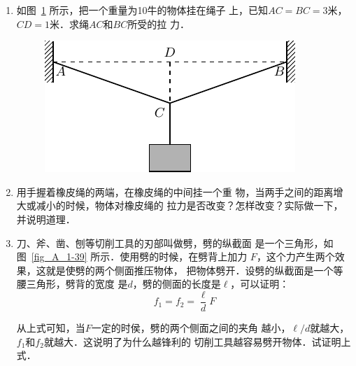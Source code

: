 \begin{enumerate}
\item 如图~\ref{fig_A_1-38} 所示，把一个重量为10牛的物体挂在绳子
上，已知$AC=BC=3$米，$CD=1$米．求绳$AC$和$BC$所受的拉
力．
\begin{figure} [htp]
\centering
\includegraphics{fig/A/1-38.pdf}
\caption{} \label{fig_A_1-38} 
\end{figure} 


\item   用手握着橡皮绳的两端，在橡皮绳的中间挂一个重
物，当两手之间的距离增大或减小的时候，物体对橡皮绳的
拉力是否改变？怎样改变？实际做一下，并说明道理．

\item  刀、斧、凿、刨等切削工具的刃部叫做劈，劈的纵截面
是一个三角形，如图~\ref{fig_A_1-39} 所示．使用劈的时候，在劈背上加力
$F$，这个力产生两个效果，这就是使劈的两个侧面推压物体，
把物体劈开．设劈的纵截面是一个等腰三角形，劈背的宽度
是$d$，劈的侧面的长度是$\ell$，可以证明：
\[f_1=f_2=\frac{\ell} {d} F \]

从上式可知，当$F$一定的时侯，劈的两个侧面之间的夹角
越小，$\ell/d$就越大，$f_1$和$f_2$就越大．这说明了为什么越锋利的
切削工具越容易劈开物体．试证明上式．




\end{enumerate}
